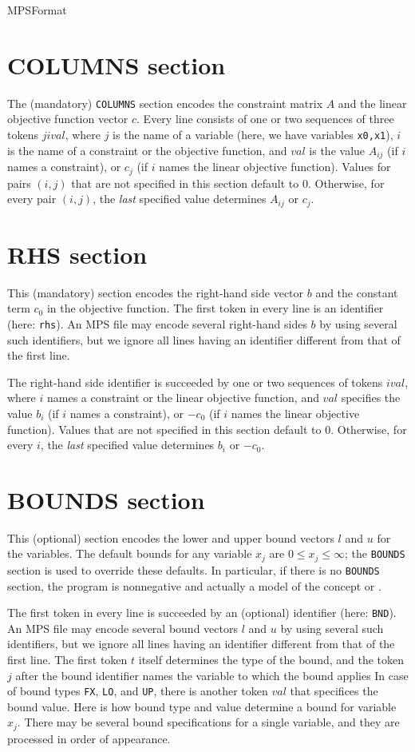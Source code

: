 \begin{ccRefConcept}{MPSFormat}
\section*{COLUMNS section}
The (mandatory) \texttt{COLUMNS} section encodes the constraint matrix
$A$ and the linear objective function vector $c$. Every line consists
of one or two sequences of three tokens $j i val$, where $j$ is the
name of a variable (here, we have variables \texttt{x0,x1}), $i$ is
the name of a constraint or the objective function, and $val$ is the
value $A_{ij}$ (if $i$ names a constraint), or $c_j$ (if $i$ names the
linear objective function). Values for pairs $(i,j)$ that are not 
specified in this section default to $0$. Otherwise, for every pair 
$(i,j)$, the \emph{last} specified value determines $A_{ij}$ or $c_j$.

\section*{RHS section}
This (mandatory) section encodes the right-hand side vector $b$ and
the constant term $c_0$ in the objective function. The first token in
every line is an identifier (here: \texttt{rhs}). An MPS file may
encode several right-hand sides $b$ by using several such identifiers,
but we ignore all lines having an identifier different from that of
the first line.

The right-hand side identifier is succeeded by one or two sequences
of tokens $i val$, where $i$ names a constraint or the linear 
objective function, and $val$ specifies the value $b_i$ (if
$i$ names a constraint), or $-c_0$ (if $i$ names the linear objective
function). Values that are not specified in this section default to $0$.
Otherwise, for every $i$, the \emph{last} specified value determines 
$b_{i}$ or $-c_0$.

\section*{BOUNDS section}
This (optional) section encodes the lower and upper bound vectors $l$ 
and $u$ for the variables. The default bounds for any variable $x_j$ are
$0\leq x_j\leq \infty$; the
\texttt{BOUNDS} section is used to override these defaults. In particular,
if there is no \texttt{BOUNDS} section, the program is nonnegative and
actually a model of the concept  
or .

The first token in every line is succeeded by an (optional) identifier
(here: \texttt{BND}). An MPS file may encode several bound vectors $l$
and $u$ by using several such identifiers, but we ignore all lines
having an identifier different from that of the first line. The first
token $t$ itself determines the type of the bound, and the token $j$
after the bound identifier names the variable to which the bound applies
In case of bound types \texttt{FX}, \texttt{LO}, and
\texttt{UP}, there is another token $val$ that specifices the bound
value. Here is how bound type and value determine a bound for variable
$x_j$. There may be several bound specifications for a single variable, and
they are processed in order of appearance.


\end{ccRefConcept}
